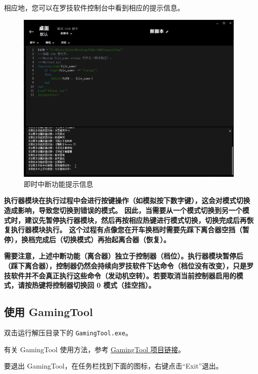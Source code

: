 相应地，您可以在罗技软件控制台中看到相应的提示信息。

\begin{figure}[H]
    \Centering
    \includegraphics[width=\textwidth]{assets/intro/interrupt.png}
    \caption{即时中断功能提示信息}
\end{figure}

\textbf{\color{red}执行器模块在执行过程中会进行按键操作（如模拟按下数字键），这会对模式切换造成影响，导致您切换到错误的模式。
因此，当需要从一个模式切换到另一个模式时，建议先暂停执行器模块，然后再按相应热键进行模式切换，切换完成后再恢复执行器模块执行。
这个过程有点像您在开车换档时需要先踩下离合器空挡（暂停），换档完成后（切换模式）再抬起离合器（恢复）。}

\textbf{\color{red}需要注意，上述中断功能（离合器）独立于控制器（档位）。执行器模块暂停后（踩下离合器），控制器仍然会持续向罗技软件下达命令（档位没有改变），只是罗技软件并不会真正执行这些命令（发动机空转）。若要取消当前控制器启用的模式，请按热键将控制器切换回 0 模式（挂空挡）。}

\subsection{使用 GamingTool}

双击运行解压目录下的 \lstinline{GamingTool.exe}。

有关 GamingTool 使用方法，参考 \href{https://gitee.com/silver1867/gaming-tool}{GamingTool 项目链接}。

要退出 GamingTool，在任务栏找到下面的图标，右键点击“Exit”退出。

